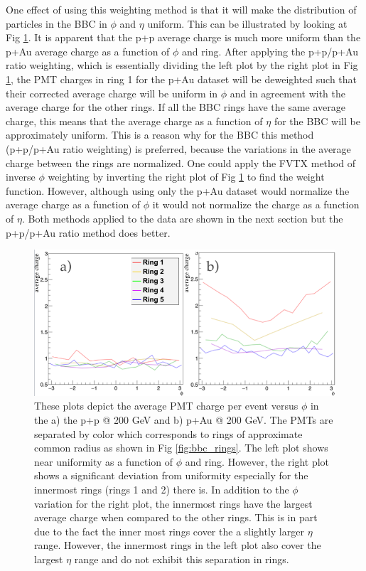 One effect of using this weighting method is that it will make the distribution of particles in the BBC in $\phi$ and $\eta $ uniform. This can be illustrated by looking at Fig \ref{fig:bbc_pmt_phi_pp_pau}. It is apparent that the p+p average charge is much more uniform than the p+Au average charge as a function of $\phi$ and ring. After applying the p+p/p+Au ratio weighting, which is essentially dividing the left plot by the right plot in Fig \ref{fig:bbc_pmt_phi_pp_pau}, the PMT charges in ring 1 for the p+Au dataset will be deweighted such that their corrected average charge will be uniform in $\phi$ and in agreement with the average charge for the other rings. If all the BBC rings have the same average charge, this means that the average charge as a function of $\eta$ for the BBC will be approximately uniform. This is a reason why for the BBC this method (p+p/p+Au ratio weighting) is preferred, because the variations in the average charge between the rings are normalized. One could apply the FVTX method of inverse $\phi$ weighting by inverting the right plot of Fig \ref{fig:bbc_pmt_phi_pp_pau} to find the weight function. However, although using only the p+Au dataset would normalize the average charge as a function of $\phi$ it would not normalize the charge as a function of $\eta$. Both methods applied to the data are shown in the next section but the p+p/p+Au ratio method does better.

\begin{figure}[h!]
\begin{center}
\includegraphics[width=0.75\linewidth]{figs/pp_pau_bbc_comparison.png}
\caption{These plots depict the average PMT charge per event versus $\phi$ in the a) the p+p @ 200 GeV and b) p+Au @ 200 GeV. The PMTs are separated by color which corresponds to rings of approximate common radius as shown in Fig \ref{fig:bbc_rings}. The left plot shows near uniformity as a function of $\phi$ and ring. However, the right plot shows a significant deviation from uniformity especially for the innermost rings (rings 1 and 2) there is. In addition to the $\phi$ variation for the right plot, the innermost rings have the largest average charge when compared to the other rings. This is in part due to the fact the inner most rings cover the a slightly larger $\eta$ range. However, the innermost rings in the left plot also cover the largest $\eta$ range and do not exhibit this separation in rings. }
\label{fig:bbc_pmt_phi_pp_pau}
\end{center}
\end{figure}


